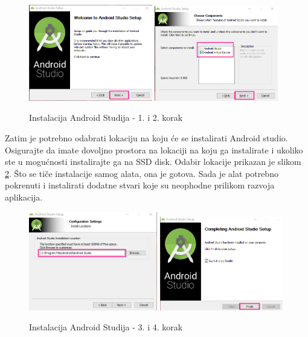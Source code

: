 \documentclass[11pt,a4paper,twoside]{article}
\begin{document}
	\begin{figure}[!h]
		\centering
		\includegraphics[width=0.48\textwidth]{install_01.png}
		\hfill
		\includegraphics[width=0.48\textwidth]{install_02.png}
		\caption{Instalacija Android Studija - 1. i 2. korak}
		\label{fig:install_01}	
	\end{figure}

	Zatim je potrebno odabrati lokaciju na koju će se instalirati Android studio. Osigurajte da imate dovoljno prostora na lokaciji na koju ga instalirate i ukoliko ste u mogućnosti instalirajte ga na SSD disk. Odabir lokacije prikazan je slikom \ref{fig:install_03}. Što se tiče instalacije samog alata, ona je gotova. Sada je alat potrebno pokrenuti i instalirati dodatne stvari koje su neophodne prilikom razvoja aplikacija. 

	\begin{figure}[!h]
		\centering
		\includegraphics[width=0.5\textwidth]{install_03.png}
			\hfill
		\includegraphics[width=0.48\textwidth]{install_04.png}
		\caption{Instalacija Android Studija - 3. i 4. korak}
		\label{fig:install_03}	
	\end{figure}
\end{document}
